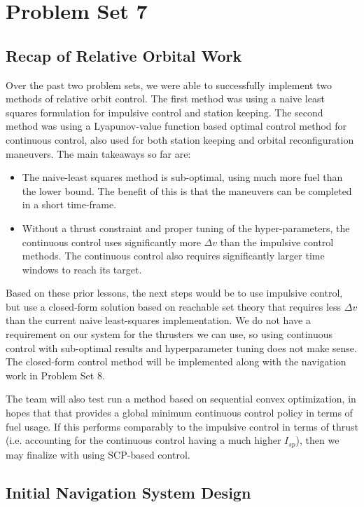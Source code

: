 \section{Problem Set 7} \label{sec:7}

\subsection{Recap of Relative Orbital Work}
Over the past two problem sets, we were able to successfully implement two methods of relative orbit control. The first method was using a naive least squares formulation for impulsive control and station keeping. The second method was using a Lyapunov-value function based optimal control method for continuous control, also used for both station keeping and orbital reconfiguration maneuvers. The main takeaways so far are:
\begin{itemize}
    \item The naive-least squares method is sub-optimal, using much more fuel than the lower bound. The benefit of this is that the maneuvers can be completed in a short time-frame. 
    \item Without a thrust constraint and proper tuning of the hyper-parameters, the continuous control uses significantly more $\Delta v$ than the impulsive control methods. The continuous control also requires significantly larger time windows to reach its target.
\end{itemize}
Based on these prior lessons, the next steps would be to use impulsive control, but use a closed-form solution based on reachable set theory that requires less $\Delta v$ than the current naive least-squares implementation. We do not have a requirement on our system for the thrusters we can use, so using continuous control with sub-optimal results and hyperparameter tuning does not make sense. The closed-form control method will be implemented along with the navigation work in Problem Set 8.

The team will also test run a method based on sequential convex optimization, in hopes that that provides a global minimum continuous control policy in terms of fuel usage. If this performs comparably to the impulsive control in terms of thrust (i.e. accounting for the continuous control having a much higher $I_{sp}$), then we may finalize with using SCP-based control.

\subsection{Initial Navigation System Design}

